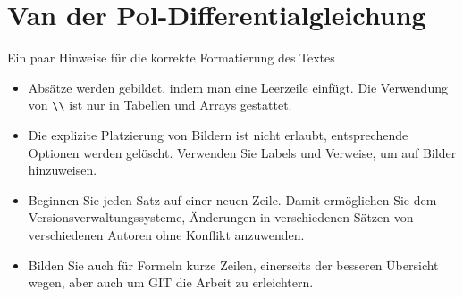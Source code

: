 %
%
%
\chapter{Van der Pol-Differentialgleichung\label{chapter:vanderpol}}
\begin{refsection}

Ein paar Hinweise für die korrekte Formatierung des Textes
\begin{itemize}
\item
Absätze werden gebildet, indem man eine Leerzeile einfügt.
Die Verwendung von \verb+\\+ ist nur in Tabellen und Arrays gestattet.
\item
Die explizite Platzierung von Bildern ist nicht erlaubt, entsprechende
Optionen werden gelöscht. 
Verwenden Sie Labels und Verweise, um auf Bilder hinzuweisen.
\item
Beginnen Sie jeden Satz auf einer neuen Zeile. 
Damit ermöglichen Sie dem Versionsverwaltungssysteme, Änderungen
in verschiedenen Sätzen von verschiedenen Autoren ohne Konflikt 
anzuwenden.
\item 
Bilden Sie auch für Formeln kurze Zeilen, einerseits der besseren
Übersicht wegen, aber auch um GIT die Arbeit zu erleichtern.
\end{itemize}






\printbibliography[heading=subbibliography]
\end{refsection}
